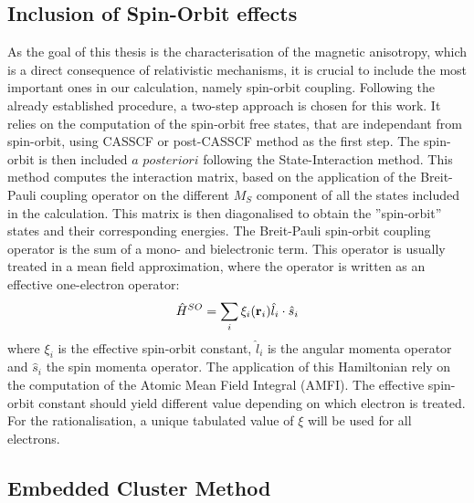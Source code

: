 \documentclass[12pt]{report}
\numberwithin{equation}{section}
\begin{document}
\subsection{Inclusion of Spin-Orbit effects}

As the goal of this thesis is the characterisation of the magnetic anisotropy, which is a direct consequence of relativistic mechanisms, it is crucial to include the most important ones in our calculation, namely spin-orbit coupling.
Following the already established procedure, a two-step approach is chosen for this work.
It relies on the computation of the spin-orbit free states, that are independant from spin-orbit, using CASSCF or post-CASSCF method as the first step.
The spin-orbit is then included $a$ $posteriori$ following the State-Interaction method.
This method computes the interaction matrix, based on the application of the Breit-Pauli coupling operator on the different $M_S$ component of all the states included in the calculation.
This matrix is then diagonalised to obtain the ''spin-orbit'' states and their corresponding energies.
The Breit-Pauli spin-orbit coupling operator is the sum of a mono- and bielectronic term.
This operator is usually treated in a mean field approximation, where the operator is written as an effective one-electron operator:
\begin{equation}
    \hat{H}^{SO}=\sum_{i} \xi_i(\vb r_i) \hat{l}_i \cdot \hat{s}_i
\end{equation}
where $\xi_i$ is the effective spin-orbit constant, $\hat{l}_i$ is the angular momenta operator and $\hat{s}_i$ the spin momenta operator.
The application of this Hamiltonian rely on the computation of the Atomic Mean Field Integral (AMFI).
The effective spin-orbit constant should yield different value depending on which electron is treated.
For the rationalisation, a unique tabulated value of $\xi$ will be used for all electrons.

\subsection{Embedded Cluster Method}
\end{document}
